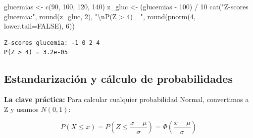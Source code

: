 \documentclass[
  letterpaper,
  DIV=11,
  numbers=noendperiod]{scrartcl}
\newenvironment{Shaded}{\begin{snugshade}}{\end{snugshade}}
\newcommand{\AttributeTok}[1]{\textcolor[rgb]{0.40,0.45,0.13}{#1}}
\newcommand{\ConstantTok}[1]{\textcolor[rgb]{0.56,0.35,0.01}{#1}}
\newcommand{\DecValTok}[1]{\textcolor[rgb]{0.68,0.00,0.00}{#1}}
\newcommand{\FunctionTok}[1]{\textcolor[rgb]{0.28,0.35,0.67}{#1}}
\newcommand{\NormalTok}[1]{\textcolor[rgb]{0.00,0.23,0.31}{#1}}
\newcommand{\OtherTok}[1]{\textcolor[rgb]{0.00,0.23,0.31}{#1}}
\newcommand{\SpecialCharTok}[1]{\textcolor[rgb]{0.37,0.37,0.37}{#1}}
\newcommand{\StringTok}[1]{\textcolor[rgb]{0.13,0.47,0.30}{#1}}
\begin{document}
\begin{Shaded}
\begin{Highlighting}[]
\NormalTok{glucemias }\OtherTok{\textless{}{-}} \FunctionTok{c}\NormalTok{(}\DecValTok{90}\NormalTok{, }\DecValTok{100}\NormalTok{, }\DecValTok{120}\NormalTok{, }\DecValTok{140}\NormalTok{)}
\NormalTok{z\_gluc }\OtherTok{\textless{}{-}}\NormalTok{ (glucemias }\SpecialCharTok{{-}} \DecValTok{100}\NormalTok{) }\SpecialCharTok{/} \DecValTok{10}
\FunctionTok{cat}\NormalTok{(}\StringTok{"Z{-}scores glucemia:"}\NormalTok{, }\FunctionTok{round}\NormalTok{(z\_gluc, }\DecValTok{2}\NormalTok{),}
    \StringTok{"}\SpecialCharTok{\textbackslash{}n}\StringTok{P(Z \textgreater{} 4) ="}\NormalTok{, }\FunctionTok{round}\NormalTok{(}\FunctionTok{pnorm}\NormalTok{(}\DecValTok{4}\NormalTok{, }\AttributeTok{lower.tail=}\ConstantTok{FALSE}\NormalTok{), }\DecValTok{6}\NormalTok{))}
\end{Highlighting}
\end{Shaded}

\begin{verbatim}
Z-scores glucemia: -1 0 2 4 
P(Z > 4) = 3.2e-05
\end{verbatim}

\subsection{Estandarización y cálculo de
probabilidades}\label{estandarizacion-y-calculo-de-probabilidades}

\textbf{La clave práctica:} Para calcular cualquier probabilidad Normal,
convertimos a Z y usamos \(N(0,1)\):

\[P(X \leq x) = P\left(Z \leq \frac{x - \mu}{\sigma}\right) = \Phi\left(\frac{x - \mu}{\sigma}\right)\]
\end{document}

